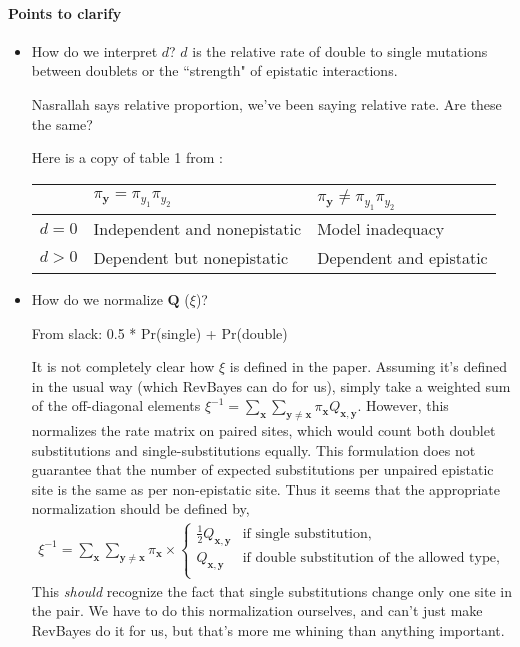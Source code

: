 \documentclass[11pt]{article}
\begin{document}
\paragraph{Points to clarify}
\begin{itemize}
\item How do we interpret $d$? $d$ is the relative rate of double to single mutations between doublets or the ``strength" of epistatic interactions.

Nasrallah says relative proportion, we've been saying relative rate.
Are these the same?

Here is a copy of table 1 from \cite{nasrallah2013phylogenetic}:

\begin{tabular}{ |p{1cm}|p{5cm}|p{5cm}|  }
 \hline
& $\pi_{\boldsymbol{y}} = \pi_{y_1}\pi_{y_2}$&$\pi_{\boldsymbol{y}} \ne \pi_{y_1}\pi_{y_2}$\\
 \hline
$d=0$  & Independent and nonepistatic & Model inadequacy \\
\hline
 $d > 0$  & Dependent but nonepistatic & Dependent and epistatic\\
 \hline
\end{tabular}

\item How do we normalize $\boldsymbol{Q}$ ($\xi$)?

From slack: 0.5 * Pr(single) + Pr(double)

It is not completely clear how $\xi$ is defined in the paper.
Assuming it's defined in the usual way (which RevBayes can do for us), simply take a weighted sum of the off-diagonal elements $\xi^{-1} = \sum_{\boldsymbol{x}} \sum_{\boldsymbol{y} \ne \boldsymbol{x}} \pi_{\boldsymbol{x}} Q_{\boldsymbol{x},\boldsymbol{y}}$.
However, this normalizes the rate matrix on paired sites, which would count both doublet substitutions and single-substitutions equally.
This formulation does not guarantee that the number of expected substitutions per unpaired epistatic site is the same as per non-epistatic site.
Thus it seems that the appropriate normalization should be defined by,
\begin{align*}
\xi^{-1} = \sum_{\boldsymbol{x}} \sum_{\boldsymbol{y} \ne \boldsymbol{x}} \pi_{\boldsymbol{x}} \times
\begin{cases}
   \frac{1}{2}Q_{\boldsymbol{x},\boldsymbol{y}} & \mbox{if single substitution,} \\
   Q_{\boldsymbol{x},\boldsymbol{y}} & \mbox{if double substitution of the allowed type,} \\
   \end{cases}
\end{align*}
This \textit{should} recognize the fact that single substitutions change only one site in the pair.
We have to do this normalization ourselves, and can't just make RevBayes do it for us, but that's more me whining than anything important.


\end{itemize}
\end{document}

